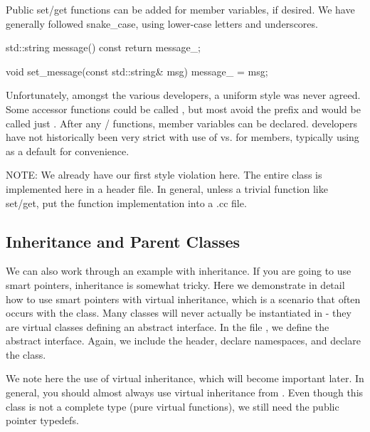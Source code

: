 Public set/get functions can be added for member variables, if desired.
We have generally followed snake\_case, using lower-case letters and underscores.

\begin{CppCode}
  std::string
  message() const {
    return message_;
   }

  void
  set_message(const std::string& msg){
    message_ = msg;
  }
\end{CppCode}
Unfortunately, amongst the various developers, a uniform style was never agreed.
Some accessor functions could be called , but most avoid the prefix and would be called just .
After any / functions, member variables can be declared.
\sstmacro developers have not historically been very strict with use of  vs.  for members, typically using  as a default for convenience. 

NOTE: We already have our first style violation here.  The entire class is implemented here in a header file.
In general, unless a trivial function like set/get, put the function implementation into a .cc file.

\subsection{Inheritance and Parent Classes}\label{subsec:inheritance}
We can also work through an example with inheritance.  
If you are going to use smart pointers, inheritance is somewhat tricky.  
Here we demonstrate in detail how to use smart pointers with virtual inheritance, 
which is a scenario that often occurs with the  class.
Many classes will never actually be instantiated in \sstmacro - they are virtual classes defining an abstract interface.
In the file , we define the  abstract interface. Again, we include the header,
declare namespaces, and declare the class.

\begin{CppCode}
#include <sprockit/ptr_type.h>

namespace sstmac {
    namespace tutorial {
    
class gem :
  virtual public sprockit::ptr_type
{
\end{CppCode}
We note here the use of virtual inheritance, which will become important later.
In general, you should almost always use virtual inheritance from .
Even though this class is not a complete type (pure virtual functions), we still need the public pointer typedefs.

